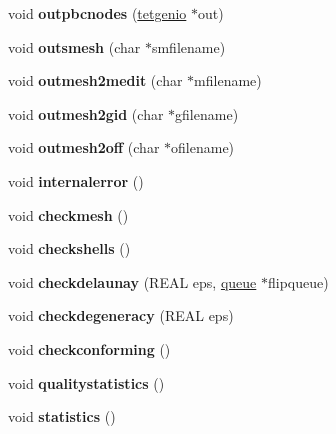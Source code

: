 \begin{DoxyCompactItemize}
void {\bfseries outpbcnodes} (\hyperlink{classStemMesh3D_1_1tetgenio}{tetgenio} $\ast$out)
\item 
\mbox{\label{classStemMesh3D_1_1tetgenmesh_ae02c7bf54d4a1e6f0a0ccee7bb39bd4f}} 
void {\bfseries outsmesh} (char $\ast$smfilename)
\item 
\mbox{\label{classStemMesh3D_1_1tetgenmesh_ae543a3e12f21bfa3422dbf0076253188}} 
void {\bfseries outmesh2medit} (char $\ast$mfilename)
\item 
\mbox{\label{classStemMesh3D_1_1tetgenmesh_a0b3ee807903a4447e222c4629bdc306e}} 
void {\bfseries outmesh2gid} (char $\ast$gfilename)
\item 
\mbox{\label{classStemMesh3D_1_1tetgenmesh_ae92f1fc8678fa1f0d95a45a06b8c7949}} 
void {\bfseries outmesh2off} (char $\ast$ofilename)
\item 
\mbox{\label{classStemMesh3D_1_1tetgenmesh_a9ac7ae6cdb13152c5d4b802f4892a099}} 
void {\bfseries internalerror} ()
\item 
\mbox{\label{classStemMesh3D_1_1tetgenmesh_a5299983e97fc1499ac715534095c80c8}} 
void {\bfseries checkmesh} ()
\item 
\mbox{\label{classStemMesh3D_1_1tetgenmesh_a82cb1752e4eef9b21f31d7f97f7b789b}} 
void {\bfseries checkshells} ()
\item 
\mbox{\label{classStemMesh3D_1_1tetgenmesh_a88d9743e49e37695555e9ee2f0ec62d7}} 
void {\bfseries checkdelaunay} (R\+E\+AL eps, \hyperlink{classStemMesh3D_1_1tetgenmesh_1_1queue}{queue} $\ast$flipqueue)
\item 
\mbox{\label{classStemMesh3D_1_1tetgenmesh_a18060f5faa91d9ebb4de684ba1aabb04}} 
void {\bfseries checkdegeneracy} (R\+E\+AL eps)
\item 
\mbox{\label{classStemMesh3D_1_1tetgenmesh_a12e4ba18dc1a3aff2119b7c7f842a49d}} 
void {\bfseries checkconforming} ()
\item 
\mbox{\label{classStemMesh3D_1_1tetgenmesh_ae18282d893eca64c3139ac65c351fb29}} 
void {\bfseries qualitystatistics} ()
\item 
\mbox{\label{classStemMesh3D_1_1tetgenmesh_a2f951b950bbc69fa470a82de9ca4ae2f}} 
void {\bfseries statistics} ()
\end{DoxyCompactItemize}
